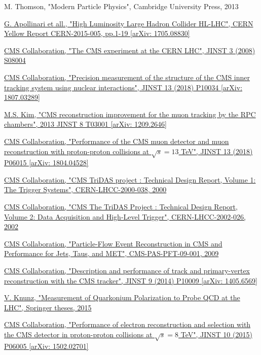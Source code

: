 \documentclass[a4paper, 10pt, openright]{report}
\begin{document}
\begin{thebibliography}{1}
M. Thomson,
"Modern Particle Physics",
Cambridge University Press, 2013

\href{https://arxiv.org/abs/1705.08830}{G. Apollinari et all.,
"High Luminosity Large Hadron Collider HL-LHC",
CERN Yellow Report CERN-2015-005, pp.1-19 [arXiv: 1705.08830]
}

\href{https://iopscience.iop.org/article/10.1088/1748-0221/3/08/S08004/pdf}{CMS Collaboration,
"The CMS experiment at the CERN LHC",
JINST 3 (2008) S08004
}

\href{https://arxiv.org/abs/1807.03289}{CMS Collaboration,
"Precision measurement of the structure of the CMS inner tracking system using nuclear interactions",
JINST 13 (2018) P10034 [arXiv: 1807.03289]
}

\href{https://arxiv.org/abs/1209.2646}{M.S. Kim,
"CMS reconstruction improvement for the muon tracking by the RPC chambers",
2013 JINST 8 T03001 [arXiv: 1209.2646]}

\href{https://arxiv.org/abs/1804.04528}{CMS Collaboration,
"Performance of the CMS muon detector and muon reconstruction with proton-proton collisions at $\sqrt{s} = 13$ TeV",
JINST 13 (2018) P06015 [arXiv: 1804.04528]}

\href{http://cdsweb.cern.ch/record/706847}{CMS Collaboration,
"CMS TriDAS project : Technical Design Report, Volume 1: The Trigger Systems",
CERN-LHCC-2000-038, 2000}

\href{http://cdsweb.cern.ch/record/578006}{CMS Collaboration,
"CMS The TriDAS Project : Technical Design Report, Volume 2: Data Acquisition and High-Level Trigger",
CERN-LHCC-2002-026, 2002}

\href{http://inspirehep.net/record/925379/}{CMS Collaboration,
"Particle-Flow Event Reconstruction in CMS and Performance for Jets, Taus, and MET",
CMS-PAS-PFT-09-001, 2009}

\href{https://arxiv.org/abs/1405.6569}{CMS Collaboration,
"Description and performance of track and primary-vertex reconstruction with the CMS tracker",
JINST 9 (2014) P10009 [arXiv: 1405.6569]}

\href{http://inspirehep.net/record/1381380}{V. Knunz,
"Measurement of Quarkonium Polarization to Probe QCD at the LHC",
Springer theses, 2015}

\href{https://arxiv.org/abs/1502.02701}{CMS Collaboration,
"Performance of electron reconstruction and selection with the CMS detector in proton-proton collisions at $\sqrt{s} = 8$ TeV",
JINST 10 (2015) P06005 [arXiv: 1502.02701]}


\end{thebibliography}
\end{document}
